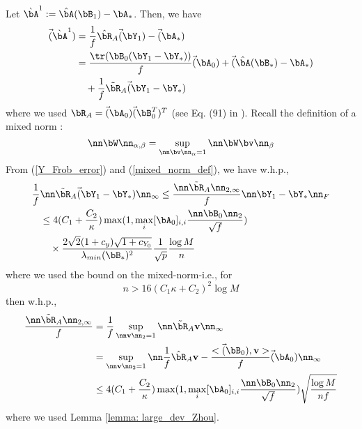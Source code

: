 \begin{IEEEproof}
Let $\grave{\bA}^1:=\hat{\bA}(\bB_1) - \bA_*$. Then, we have
\begin{align}
	\vec(\grave{\bA}^1) &= \frac{1}{f} \hat{\bR}_A \vec(\bY_1) - \vec(\bA_*) \nonumber \\
		&= \frac{\tr(\bB_0(\bY_1-\bY_*))}{f} \vec(\bA_0) + \vec(\hat{\bA}(\bB_*)-\bA_*) \nonumber \\
		&\quad + \frac{1}{f} \tilde{\bR}_A \vec(\bY_1-\bY_*) \label{grave_A_1}
\end{align}
where we used $\bR_A=\vec(\bA_0)\vec(\bB_0^T)^T$ (see Eq. (91) in \cite{EstCovMatKron}). Recall the definition of a mixed norm \cite{HornJohnson}:
\begin{equation} \label{mixed_norm_def}
	\nn \bW \nn_{\alpha,\beta} = \sup_{\nn \bv \nn_{\alpha}=1} \nn \bW \bv \nn_\beta
\end{equation}
From (\ref{Y_Frob_error}) and (\ref{mixed_norm_def}), we have w.h.p.,
\begin{align}
	\frac{1}{f} & \nn \tilde{\bR}_A \vec(\bY_1-\bY_*)\nn_\infty \leq \frac{\nn \tilde{\bR}_A \nn_{2,\infty}}{f} \nn \bY_1-\bY_* \nn_F \nonumber \\
		&\leq 4(C_1+\frac{C_2}{\kappa}) \max(1,\max_i [\bA_0]_{i,i} \frac{\nn\bB_0\nn_2}{\sqrt{f}}) \nonumber \\
		&\quad \times \frac{2\sqrt{2}(1+c_y)\sqrt{1+c_{Y_0}}}{\lambda_{min}(\bB_*)^2}  \frac{1}{\sqrt{p}} \frac{\log M}{n} \label{bound_infty}
\end{align}
where we used the bound on the mixed-norm-i.e., for
\begin{equation} \label{condition_1}
	n>16(C_1 \kappa + C_2)^2 \log M
\end{equation}
then w.h.p.,
\begin{align*}
	\frac{\nn \tilde{\bR}_A \nn_{2,\infty}}{f} &=\frac{1}{f} \sup_{\nn \mathbf{v}\nn_2=1} \nn \tilde{\bR}_A \mathbf{v}\nn_\infty \\\
		&= \sup_{\nn \mathbf{v}\nn_2=1} \nn \frac{1}{f} \hat{\bR}_A \mathbf{v} - \frac{<\vec(\bB_0),\mathbf{v}>}{f} \vec(\bA_0) \nn_\infty \nonumber \\
		&\leq 4(C_1+\frac{C_2}{\kappa}) \max(1,\max_i [\bA_0]_{i,i} \frac{\nn \bB_0 \nn_2}{\sqrt{f}} )  \sqrt{\frac{\log M}{nf}}
\end{align*}
where we used Lemma \ref{lemma: large_dev_Zhou}.



\end{IEEEproof}
